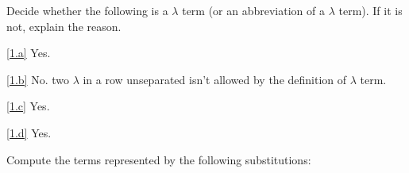 \documentclass{homework}
\begin{document}
\begin{problem}
  Decide whether the following is a $\lambda$ term (or an abbreviation of a
  $\lambda$ term).
  If it is not, explain the reason.
\end{problem}

\begin{solution}

  \ref{1.a} %
  Yes.

  \ref{1.b} %
  No. two $\lambda$ in a row unseparated isn't allowed by the definition of $\lambda$ term.

  \ref{1.c}
  Yes.

  \ref{1.d}
  Yes.

\end{solution}

\begin{problem}
  Compute the terms represented by the following substitutions:
\end{problem}
\end{document}
